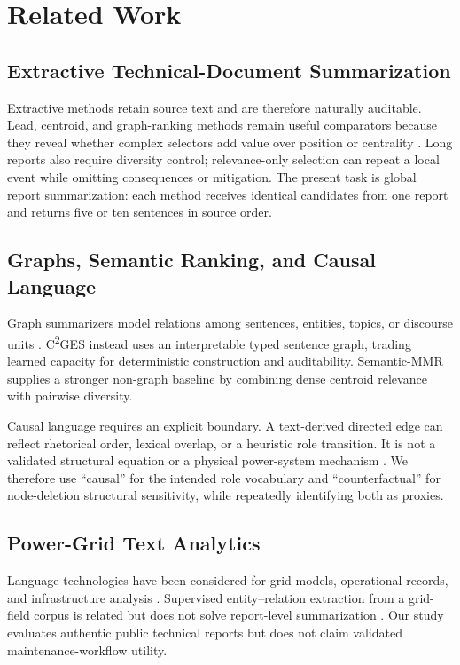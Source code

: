 \documentclass[applsci,article,submit,moreauthors]{Definitions/mdpi}
\newcommand{\cges}{C\textsuperscript{2}GES}
\begin{document}
\section{Related Work}

\subsection{Extractive Technical-Document Summarization}

Extractive methods retain source text and are therefore naturally auditable. Lead, centroid, and graph-ranking methods remain useful comparators because they reveal whether complex selectors add value over position or centrality \cite{zhong2020extractive,bi2021aredsum,liu2021unsupervised}. Long reports also require diversity control; relevance-only selection can repeat a local event while omitting consequences or mitigation. The present task is global report summarization: each method receives identical candidates from one report and returns five or ten sentences in source order.

\subsection{Graphs, Semantic Ranking, and Causal Language}

Graph summarizers model relations among sentences, entities, topics, or discourse units \cite{wang2020heterogeneous,cui2020enhancing,jing2021multiplex}. \cges{} instead uses an interpretable typed sentence graph, trading learned capacity for deterministic construction and auditability. Semantic-MMR supplies a stronger non-graph baseline by combining dense centroid relevance with pairwise diversity.

Causal language requires an explicit boundary. A text-derived directed edge can reflect rhetorical order, lexical overlap, or a heuristic role transition. It is not a validated structural equation or a physical power-system mechanism \cite{feder2022causal}. We therefore use ``causal'' for the intended role vocabulary and ``counterfactual'' for node-deletion structural sensitivity, while repeatedly identifying both as proxies.

\subsection{Power-Grid Text Analytics}

Language technologies have been considered for grid models, operational records, and infrastructure analysis \cite{xie2022massively,hamann2024foundation,madabhushi2023survey,srinivasan2023artificial}. Supervised entity--relation extraction from a grid-field corpus is related but does not solve report-level summarization \cite{meng2023gridfield}. Our study evaluates authentic public technical reports but does not claim validated maintenance-workflow utility.
\end{document}
